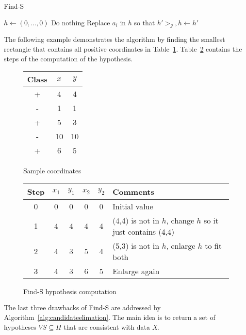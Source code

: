 \documentclass{report}
\begin{document}
\begin{algorithm}
\caption{Find-S}
\label{alg:finds}
\begin{algorithmic}
\State $h \gets (0,...,0)$ 
\State Do nothing
\Else
\State Replace $a_i$ in $h$ so that $h' >_g, h\gets h'$
\EndIf
\EndFor
\EndFor
\\
\end{algorithmic}
\end{algorithm}

The following example demonstrates the algorithm by finding the smallest rectangle that contains all positive coordinates in Table~\ref{table:coordinates}. Table~\ref{table:findscomputation} contains the steps of the computation of the hypothesis.

\begin{figure}[h!]
\centering
\begin{tabular}{c||c|c}
Class & $x$ & $y$ \\
\hline
\hline
+ & 4 & 4 \\
- & 1 & 1 \\
+ & 5 & 3 \\
- & 10 & 10 \\
+ & 6 & 5
\end{tabular}
\caption{Sample coordinates}
\label{table:coordinates}
\end{figure}


\begin{figure}[h!]
\centering
\begin{tabular}{c||c|c|c|c||l}
Step & $x_1$ & $y_1$ & $x_2$ & $y_2$ & Comments \\
\hline
\hline
0 & 0 & 0 & 0 & 0 & Initial value \\
1 & 4 & 4 & 4 & 4 & (4,4) is not in $h$, change $h$ so it just contains (4,4) \\
2 & 4 & 3 & 5 & 4 & (5,3) is not in $h$, enlarge $h$ to fit both \\
3 & 4 & 3 & 6 & 5 &  Enlarge again
\end{tabular}
\caption{Find-S hypothesis computation}
\label{table:findscomputation}
\end{figure}


The last three drawbacks of Find-S are addressed by Algorithm~\ref{alg:candidateelimation}. The main idea is to return a set of hypotheses $VS\subseteq H$ that are consistent with data $X$.
\end{document}

